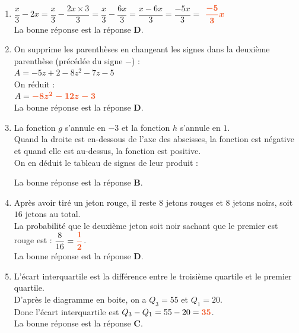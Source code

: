 \documentclass[a4paper,11pt]{article}
\begin{document}
\newpage
\begin{seance}{} %

\begin{enumerate}
\item $\dfrac{x}{3}-2x=\dfrac{x}{3}-\dfrac{2x\times 3}{3}=\dfrac{x}{3}-\dfrac{6x}{3}=\dfrac{x-6x}{3}=\dfrac{-5x}{3}=$ ${\color[HTML]{F15929}\boldsymbol{\dfrac{-5}{3}x}}$\\La bonne réponse est la réponse {\bfseries \color[HTML]{F15929}D}.

\item On supprime les parenthèses en changeant les signes dans la deuxième parenthèse (précédée du signe $-$) :\\$A= -5z+2 -8z^2-7z-5$\\On réduit :\\$A={\color[HTML]{F15929}\boldsymbol{-8z^2-12z-3}}$\\La bonne réponse est la réponse {\bfseries \color[HTML]{F15929}D}.

\item La fonction $g$ s'annule en $-3$ et la fonction $h$ s'annule en $1$.\\
    Quand la droite est en-dessous de l'axe des abscisses, la fonction est négative et quand elle est au-dessus, la fonction est positive.\\
    On en déduit le tableau de signes de leur produit :\\
    \begin{center}
    \end{center}
La bonne réponse est la réponse {\bfseries \color[HTML]{F15929}B}.

\item Après avoir tiré un jeton rouge, il reste $8$ jetons rouges et $8$ jetons noirs, soit $16$ jetons au total.\\La probabilité que le deuxième jeton soit noir sachant que le premier est rouge est : $\dfrac{8}{16}={\color[HTML]{F15929}\boldsymbol{\dfrac{1}{2}}}$.\\La bonne réponse est la réponse {\bfseries \color[HTML]{F15929}D}.

\item L'écart interquartile est la différence entre le troisième quartile et le premier quartile.\\
      D'après le diagramme en boite, on a $Q_3 = 55$ et $Q_1 = 20$.\\
      Donc l'écart interquartile est $Q_3 - Q_1 = 55 - 20 = {\color[HTML]{F15929}\boldsymbol{35}}$.\\La bonne réponse est la réponse {\bfseries \color[HTML]{F15929}C}.


\end{enumerate}
\end{seance}
\end{document}
